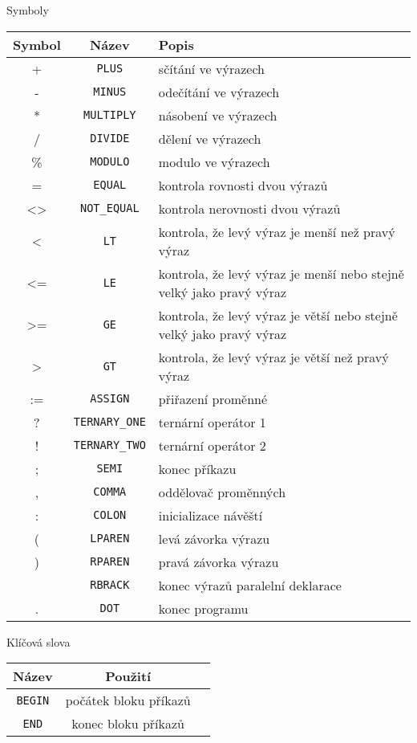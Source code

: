 \documentclass[
12pt,
a4paper,
pdftex,
czech
]{report}
\begin{document}
\begin{table}
\centering
\caption{Symboly}
\label{Symboly}
\end{table}
\begin{longtable}{|c|c|p{10cm}|}
\hline
		\textbf{Symbol} & \textbf{Název} & \textbf{Popis} \\
\hline
+ & \texttt{PLUS} & sčítání ve výrazech \\ \hline
- & \texttt{MINUS} & odečítání ve výrazech \\ \hline
* & \texttt{MULTIPLY} & násobení ve výrazech \\ \hline
/ & \texttt{DIVIDE} & dělení ve výrazech \\ \hline
\% & \texttt{MODULO} & modulo ve výrazech \\ \hline
= & \texttt{EQUAL} &  kontrola rovnosti dvou výrazů \\ \hline
<> & \texttt{NOT\_EQUAL} & kontrola nerovnosti dvou výrazů \\ \hline
< & \texttt{LT} & kontrola, že levý výraz je menší než pravý výraz \\ \hline
<= & \texttt{LE} & kontrola, že levý výraz je menší nebo stejně velký jako pravý výraz \\ \hline
>= & \texttt{GE} & kontrola, že levý výraz je větší nebo stejně velký jako pravý výraz \\ \hline
> & \texttt{GT} & kontrola, že levý výraz je větší než pravý výraz \\ \hline
:= & \texttt{ASSIGN} & přiřazení proměnné \\ \hline
? & \texttt{TERNARY\_ONE} & ternární operátor 1 \\ \hline
! & \texttt{TERNARY\_TWO} & ternární operátor 2 \\ \hline
; & \texttt{SEMI} & konec příkazu \\ \hline
, & \texttt{COMMA} & oddělovač proměnných \\ \hline
: & \texttt{COLON} & inicializace návěští \\ \hline
( & \texttt{LPAREN} & levá závorka výrazu \\ \hline
) & \texttt{RPAREN} & pravá závorka výrazu \\ \hline
[ & \texttt{LBRACK} & počátek výrazů paralelní deklarace \\ \hline
] & \texttt{RBRACK} & konec výrazů paralelní deklarace \\ \hline
. & \texttt{DOT} & konec programu \\ \hline
\end{longtable}


\begin{table}
\centering
\caption{Klíčová slova}
\label{Slova}
\end{table}
\begin{longtable}{|c|c|p{10cm}|}
\hline
		\textbf{Název} &\textbf{Použití} \\
\hline
\texttt{BEGIN} & počátek bloku příkazů \\ \hline
\texttt{END} & konec bloku příkazů \\ \hline
\end{longtable}
\end{document}
